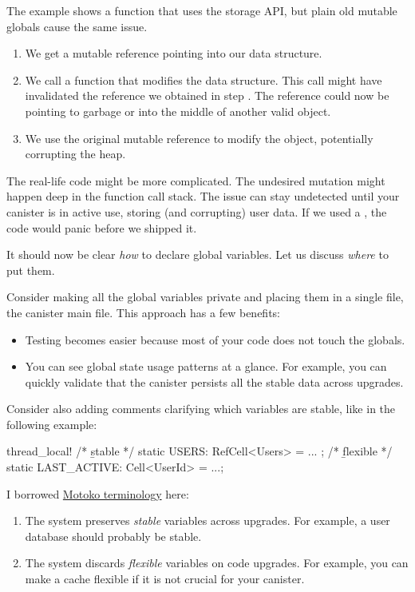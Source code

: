 \documentclass{article}
\begin{document}
The example shows a function that uses the storage API, but plain old mutable globals cause the same issue.
\begin{enumerate}
\item We get a mutable reference pointing into our data structure.
\item 
  We call a function that modifies the data structure.
  This call might have invalidated the reference we obtained in step .
  The reference could now be pointing to garbage or into the middle of another valid object.
\item 
  We use the original mutable reference to modify the object, potentially corrupting the heap.
\end{enumerate}

The real-life code might be more complicated.
The undesired mutation might happen deep in the function call stack.
The issue can stay undetected until your canister is in active use, storing (and corrupting) user data.
If we used a , the code would panic before we shipped it.

It should now be clear \emph{how} to declare global variables.
Let us discuss \emph{where} to put them.


Consider making all the global variables private and placing them in a single file, the canister main file.
This approach has a few benefits:

\begin{itemize}
 \item Testing becomes easier because most of your code does not touch the globals.
 \item 
   You can see global state usage patterns at a glance.
   For example, you can quickly validate that the canister persists all the stable data across upgrades.
\end{itemize}

Consider also adding comments clarifying which variables are stable, like in the following example:

\begin{code}[good]
thread_local! {
    /* \b{stable}    */ static USERS: RefCell<Users> = ... ;
    /* \b{flexible}  */ static LAST_ACTIVE: Cell<UserId> = ...;
}
\end{code}

I borrowed \href{https://sdk.dfinity.org/docs/language-guide/upgrades.html#_declaring_stable_variables}{Motoko terminology} here:
\begin{enumerate}
  \item 
    The system preserves \emph{stable} variables across upgrades.
    For example, a user database should probably be stable.
  \item 
    The system discards \emph{flexible} variables on code upgrades.
    For example, you can make a cache flexible if it is not crucial for your canister.
\end{enumerate}
\end{document}
